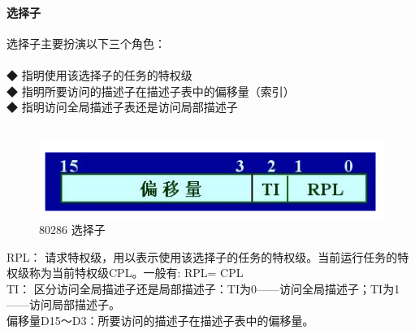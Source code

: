 \documentclass[12pt]{article}
\begin{document}
\paragraph{选择子}
选择子主要扮演以下三个角色：\\\\
◆ 指明使用该选择子的任务的特权级\\
◆ 指明所要访问的描述子在描述子表中的偏移量（索引）\\
◆ 指明访问全局描述子表还是访问局部描述子\\\\
\begin{figure}[htbp]
\centering
\includegraphics[scale=0.7]{fig/18.png}
\caption{80286 选择子}
\label{fig:80286 Segment Selector}
\end{figure}
RPL： 请求特权级，用以表示使用该选择子的任务的特权级。当前运行任务的特权级称为当前特权级CPL。一般有: RPL= CPL\\
TI： 区分访问全局描述子还是局部描述子：TI为0——访问全局描述子；TI为1——访问局部描述子。\\
偏移量D15～D3：所要访问的描述子在描述子表中的偏移量。
\end{document}
